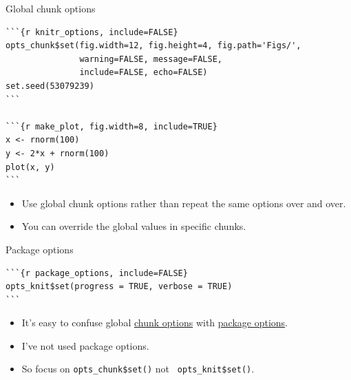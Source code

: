 \documentclass[12pt,t]{beamer}
\newcommand{\hilit}{\color{hilit}}
\newcommand{\lolit}{\color{lolit}}
\newcommand{\bi}{\begin{itemize}}
\newcommand{\ei}{\end{itemize}}
\begin{document}
\begin{frame}[fragile]{Global chunk options}

\vspace{6pt}

\begin{lstlisting}
```{r knitr_options, include=FALSE}
opts_chunk$set(fig.width=12, fig.height=4, fig.path='Figs/',
               warning=FALSE, message=FALSE, 
               include=FALSE, echo=FALSE)
set.seed(53079239)
```

```{r make_plot, fig.width=8, include=TRUE}
x <- rnorm(100)
y <- 2*x + rnorm(100)
plot(x, y)
```
\end{lstlisting}

\vfill

\bi
\itemsep12pt
\item Use global chunk options rather than repeat the same options over and over.
\item You can override the global values in specific chunks.
\ei

\end{frame}





\begin{frame}[fragile]{Package options}

\vspace{24pt}

\begin{lstlisting}
```{r package_options, include=FALSE}
opts_knit$set(progress = TRUE, verbose = TRUE)
```
\end{lstlisting}

\vfill
\bi
\itemsep12pt
\item It's easy to confuse global \href{http://yihui.name/knitr/options#chunk_options}{chunk options} with 
\href{http://yihui.name/knitr/options#package_options}{package options}.
\item I've not used package options.
\item So focus on {\tt \hilit opts\_chunk\$set()} not {\tt
  \lolit opts\_knit\$set()}.
\ei

\end{frame}
\end{document}
